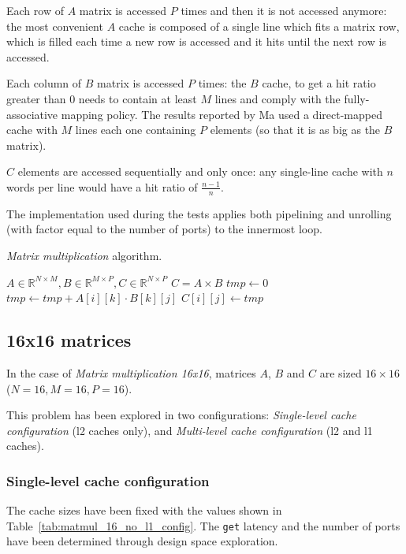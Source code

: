 \documentclass[11pt,a4paper,oneside]{memoir}
\begin{document}
Each row of $A$ matrix is accessed $P$ times and then it is not accessed
anymore: the most convenient $A$ cache is composed of a single line which fits a
matrix row, which is filled each time a new row is accessed and it hits until
the next row is accessed.

Each column of $B$ matrix is accessed $P$ times: the $B$ cache, to get a hit
ratio greater than 0 needs to contain at least $M$ lines and comply with the
fully-associative mapping policy.
The results reported by Ma used a direct-mapped cache with $M$ lines each one
containing $P$ elements (so that it is as big as the $B$ matrix).

$C$ elements are accessed sequentially and only once: any single-line cache with
$n$ words per line would have a hit ratio of $\frac{n - 1}{n}$.

\bigskip
The implementation used during the tests applies both pipelining and unrolling
(with factor equal to the number of ports) to the innermost loop.

\begin{algorithm}
	\caption{\emph{Matrix multiplication} algorithm.}\label{alg:matmul}
	\begin{algorithmic}
		\Require $A \in \mathbb{R}^{N \times M},
		B \in \mathbb{R}^{M \times P}, C \in \mathbb{R}^{N \times P}$
		\Ensure $C = A \times B$
					\State $tmp \gets 0$
						\State $tmp \gets tmp +
							A[i][k] \cdot B[k][j]$
					\EndFor
					\State $C[i][j] \gets tmp$
				\EndFor
			\EndFor
		\EndProcedure
	\end{algorithmic}
\end{algorithm}

\subsection{16x16 matrices}
In the case of \emph{Matrix multiplication 16x16}, matrices $A$, $B$ and $C$ are
sized $16 \times 16$ ($N = 16, M = 16, P = 16$).

This problem has been explored in two configurations: \emph{Single-level cache
configuration} (\ac{l2} caches only), and \emph{Multi-level cache
configuration} (\ac{l2} and \ac{l1} caches).

\subsubsection{Single-level cache configuration}
The cache sizes have been fixed with the values shown in
Table~\ref{tab:matmul_16_no_l1_config}. The \texttt{get} latency and the number
of ports have been determined through design space exploration.
\end{document}
